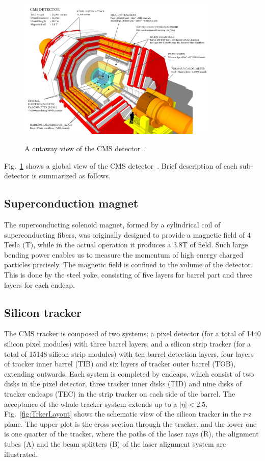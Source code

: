 \begin{figure}[!ht]
  \begin{center}
    \includegraphics[width=0.85\textwidth]{Fig/cms_120918_03}\\
    \caption{A cutaway view of the CMS detector~\cite{Sakuma:1626816}. \label{fig:CMSdetector}}
  \end{center}
\end{figure}
Fig.~\ref{fig:CMSdetector} shows a global view of the CMS detector~\cite{Sakuma:1626816}. Brief description of each sub-detector is summarized as follows.

\subsection*{Superconduction magnet}
The superconducting solenoid magnet, formed by a cylindrical coil of superconducting fibers, was originally designed to provide a magnetic field of 4 Tesla (T), while in the actual operation it produces a 3.8\unit{T} of field. Such large bending power enables us to measure the momentum of high energy charged particles precisely. 
The magnetic field is confined to the volume of the detector. This is done by the steel yoke, consisting of five layers for barrel part and three layers for each endcap. 
\subsection*{Silicon tracker}
The CMS tracker is composed of two systems: a pixel detector (for a total of 1440 silicon pixel modules) with three barrel layers, and a silicon strip tracker (for a total of 15148 silicon strip modules) with ten barrel detection layers, four layers of tracker inner barrel (TIB) and six layers of tracker outer barrel (TOB), extending outwards. 
Each system is completed by endcaps, which consist of two disks in the pixel detector, three tracker inner disks (TID) and nine disks of tracker endcaps (TEC) in the strip tracker on each side of the barrel. The acceptance of the whole tracker system extends up to a $|\eta|<2.5$. 
Fig.~\ref{fig:TrkerLayout} shows the schematic view of the silicon tracker in the r-z plane. The upper plot is the cross section through the tracker, and the lower one is one quarter of the tracker, where the paths of the laser rays (R), the alignment tubes (A) and the beam splitters (B) of the laser alignment system are illustrated.

